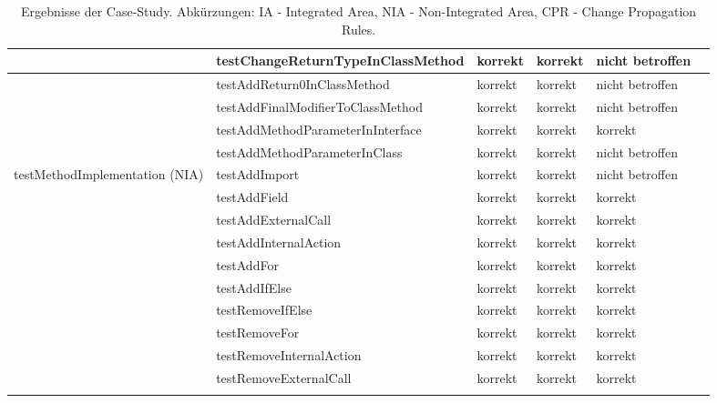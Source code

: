 \begin{tiny}
\begin{longtable}[c]{|p{2.2cm}|p{3.5cm}|p{1cm}|p{1cm}|p{1cm}|p{4cm}|}
 & testChangeReturnTypeInClassMethod & korrekt & korrekt & nicht 			betroffen &  \\ \hline
 & testAddReturn0InClassMethod & korrekt & korrekt & nicht 			betroffen &  \\ \hline
 & testAddFinalModifierToClassMethod & korrekt & korrekt & nicht 			betroffen &  \\ \hline
 & testAddMethodParameterInInterface & korrekt & korrekt & korrekt &  \\ \hline
 & testAddMethodParameterInClass & korrekt & korrekt & nicht 			betroffen &  \\ \hline
testMethodImplementation 			(NIA) & testAddImport & korrekt & korrekt & nicht betroffen &  \\ \hline
 & testAddField & korrekt & korrekt & korrekt &  \\ \hline
 & testAddExternalCall & korrekt & korrekt & korrekt &  \\ \hline
 & testAddInternalAction & korrekt & korrekt & korrekt &  \\ \hline
 & testAddFor & korrekt & korrekt & korrekt &  \\ \hline
 & testAddIfElse & korrekt & korrekt & korrekt &  \\ \hline
 & testRemoveIfElse & korrekt & korrekt & korrekt &  \\ \hline
 & testRemoveFor & korrekt & korrekt & korrekt &  \\ \hline
 & testRemoveInternalAction & korrekt & korrekt & korrekt &  \\ \hline
 & testRemoveExternalCall & korrekt & korrekt & korrekt &  \\ \hline
\caption{Ergebnisse der Case-Study. Abkürzungen: IA - Integrated Area, NIA - Non-Integrated Area, CPR - Change Propagation Rules.}
\label{tab:casestudy}\\
\end{longtable}

 
\end{tiny} 
 
